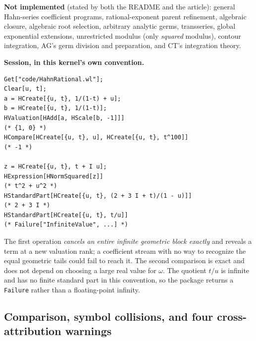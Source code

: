 \documentclass[11pt,letterpaper]{article}
\numberwithin{equation}{section}
\theoremstyle{definition}
\theoremstyle{remark}
\begin{document}
\textbf{Not implemented} (stated by both the README and the article): general
Hahn-series coefficient programs, rational-exponent parent refinement, algebraic
closure, algebraic root selection, arbitrary analytic germs, transseries, global
exponential extensions, unrestricted modulus (only \emph{squared} modulus),
contour integration, AG's germ division and preparation, and CT's integration
theory.

\textbf{Session, in this kernel's own convention.}
\begin{lstlisting}
Get["code/HahnRational.wl"];
Clear[u, t];
a = HCreate[{u, t}, 1/(1-t) + u];
b = HCreate[{u, t}, 1/(1-t)];
HValuation[HAdd[a, HScale[b, -1]]]
(* {1, 0} *)
HCompare[HCreate[{u, t}, u], HCreate[{u, t}, t^100]]
(* -1 *)

z = HCreate[{u, t}, t + I u];
HExpression[HNormSquared[z]]
(* t^2 + u^2 *)
HStandardPart[HCreate[{u, t}, (2 + 3 I + t)/(1 - u)]]
(* 2 + 3 I *)
HStandardPart[HCreate[{u, t}, t/u]]
(* Failure["InfiniteValue", ...] *)
\end{lstlisting}
The first operation \emph{cancels an entire infinite geometric block exactly}
and reveals a term at a new valuation rank; a coefficient stream with no way to
recognize the equal geometric tails could fail to reach it. The second
comparison is exact and does not depend on choosing a large real value for
$\omega$. The quotient $t/u$ is infinite and has no finite standard part in this
convention, so the package returns a \texttt{Failure} rather than a
floating-point infinity.

\subsection{Comparison, symbol collisions, and four cross-attribution warnings}
\label{cas:sub-comparison}
\end{document}
